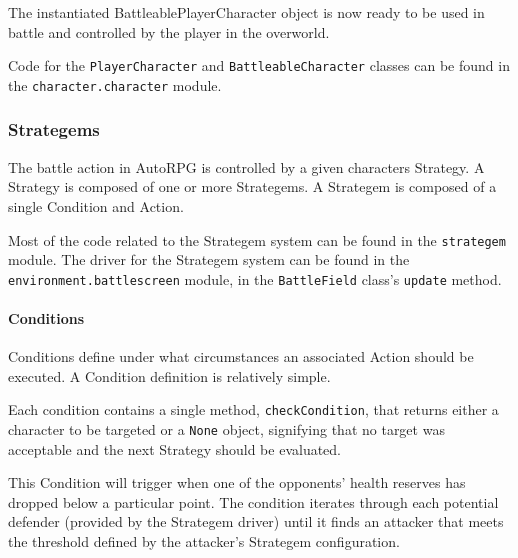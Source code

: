 \documentclass[11pt]{article}
\begin{document}
The instantiated BattleablePlayerCharacter object is now ready to be used in battle and controlled by the player in the overworld.

Code for the \texttt{PlayerCharacter} and \texttt{BattleableCharacter} classes can be found in the \texttt{character.character} module.

\subsubsection{Strategems}

The battle action in AutoRPG is controlled by a given characters Strategy.  A Strategy is composed of one or more Strategems.  A Strategem is composed of a single Condition and Action.

Most of the code related to the Strategem system can be found in the \texttt{strategem} module.  The driver for the Strategem system can be found in the \texttt{environment.battlescreen} module, in the \texttt{BattleField} class's \texttt{update} method.

\paragraph{Conditions} \hfill %

Conditions define under what circumstances an associated Action should be executed. A Condition definition is relatively simple.  

\singlespacing
{}
\doublespacing

Each condition contains a single method, \texttt{checkCondition}, that returns either a character to be targeted or a \texttt{None} object, signifying that no target was acceptable and the next Strategy should be evaluated.

This Condition will trigger when one of the opponents' health reserves has dropped below a particular point.  The condition iterates through each potential defender (provided by the Strategem driver) until it finds an attacker that meets the threshold defined by the attacker's Strategem configuration.
\end{document}
